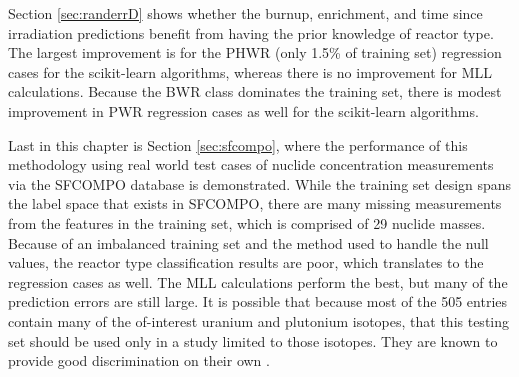 Section \ref{sec:randerrD} shows whether the burnup, enrichment, and time since
irradiation predictions benefit from having the prior knowledge of reactor
type.  The largest improvement is for the \gls{PHWR} (only 1.5\% of training
set) regression cases for the scikit-learn algorithms, whereas there is no
improvement for \gls{MLL} calculations. Because the \gls{BWR} class dominates
the training set, there is modest improvement in \gls{PWR} regression cases as
well for the scikit-learn algorithms.

Last in this chapter is Section \ref{sec:sfcompo}, where the performance of
this methodology using real world test cases of nuclide concentration
measurements via the \gls{SFCOMPO} database is demonstrated.  While the
training set design spans the label space that exists in \gls{SFCOMPO}, there
are many missing measurements from the features in the training set, which is
comprised of 29 nuclide masses.  Because of an imbalanced training set and the
method used to handle the null values, the reactor type classification results
are poor, which translates to the regression cases as well.  The \gls{MLL}
calculations perform the best, but many of the prediction errors are still
large. It is possible that because most of the 505 entries contain many of the
of-interest uranium and plutonium isotopes, that this testing set should be
used only in a study limited to those isotopes. They are known to provide good
discrimination on their own \cite{pu_discrimination, nicolaou_2006,
nicolaou_pu, nicolaou_2009, nicolaou_2014, nicolaou_2015}.
